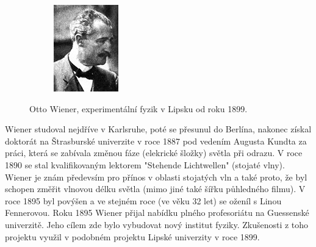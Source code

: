 \documentclass[12pt,a4paper,titlepage,final]{report}
\begin{document}
\begin{figure}[!htb]
\begin{subfigure}[b]{0.4\textwidth}
 		\includegraphics[width=\textwidth]{Otto_Wiener_mini}
	\end{subfigure}
	
	\caption{Otto Wiener, experimentální fyzik v Lipsku od roku 1899.}\label{fig:otto}
\end{figure}       

Wiener studoval nejdříve v Karlsruhe, poté se přesunul do Berlína, nakonec získal doktorát na Štrasburské univerzite v roce 1887
pod vedením Augusta Kundta za práci, která se zabívala změnou fáze (elekrické šložky) světla při odrazu. V roce 1890 se stal kvalifikovaným lektorem "Stehende Lichtwellen" (stojaté vlny). Wiener je znám předevsím pro přínos v oblasti stojatých vln a také proto, že byl schopen změřit 
vlnovou délku světla (mimo jiné také šířku půhledného filmu). V roce 1895 byl povýšen a ve stejném roce (ve věku 32 let) se oženíl s Linou Fennerovou. 
Roku 1895 Wiener přijal nabídku plného profesoriátu na Guessenské univerzitě. Jeho cílem zde bylo vybudovat nový institut fyziky. 
Zkušenosti z toho projektu využil v podobném projektu Lipské univerzity v roce 1899. \cite{encyclopedia_otto}
\end{document}
